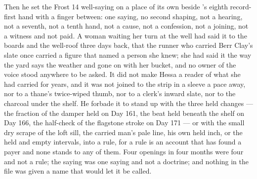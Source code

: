 Then he set the Frost 14 well-saying on a place of its own beside 's eighth record-first hand with a finger between: one saying, no second shaping, not a hearing, not a seventh, not a tenth hand, not a cause, not a confession, not a joining, not a witness and not paid. A woman waiting her turn at the well had said it to the boards and the well-roof three days back, that the runner who carried Berr Clay's slate once carried a figure that named a person she knew; she had said it the way the yard says the weather and gone on with her bucket, and no owner of the voice stood anywhere to be asked. It did not make Hessa a reader of what she had carried for years, and it was not joined to the strip in a sleeve a pace away, nor to a thane's twice-wiped thumb, nor to a clerk's inward slate, nor to the charcoal under the shelf. He forbade it to stand up with the three held changes --- the fraction of the damper held on Day 161, the beat held beneath the shelf on Day 166, the half-check of the flagstone stroke on Day 171 --- or with the small dry scrape of the loft sill, the carried man's pale line, his own held inch, or the held and empty intervals, into a rule, for a rule is an account that has found a payer and none stands to any of them. Four openings in four months were four and not a rule; the saying was one saying and not a doctrine; and nothing in the file was given a name that would let it be called.

\scenebreak

